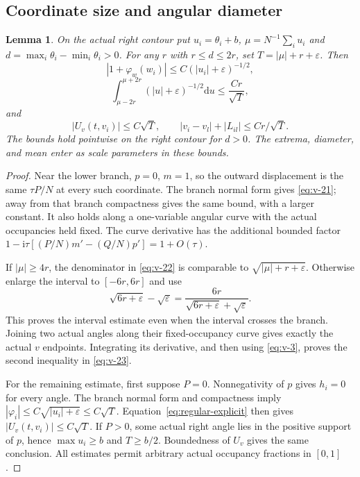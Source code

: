 \documentclass[11pt]{article}
\numberwithin{equation}{section}
\newtheorem{lemma}[theorem]{Lemma}
\theoremstyle{remark}\newtheorem{remark}[theorem]{Remark}
\newcommand{\ii}{\mathrm i}
\newcommand{\dd}{\mathrm d}
\begin{document}
\subsection{Coordinate size and angular diameter}

\begin{lemma}\label{lem:coordinate-scale}
On the actual right contour put
$u_i=\theta_i+b$, $\mu=N^{-1}\sum_i u_i$ and
$d=\max_i\theta_i-\min_i\theta_i>0$.
For any $r$ with $r\le d\le2r$, set $T=|\mu|+r+\varepsilon$.
Then
\begin{equation}\label{eq:v-21}
 |1+\varphi_w(w_i)|\le C(|u_i|+\varepsilon)^{-1/2},
\end{equation}
\begin{equation}\label{eq:v-22}
 \int_{\mu-2r}^{\mu+2r}(|u|+\varepsilon)^{-1/2}\dd u
       \le\frac{Cr}{\sqrt T},
\end{equation}
and
\begin{equation}\label{eq:v-23}
 |U_v(t,v_i)|\le C\sqrt T,\qquad
 |v_i-v_l|+|L_{il}|\le Cr/\sqrt T.
\end{equation}
The bounds hold pointwise on the right contour for $d>0$. The
extrema, diameter, and mean enter as scale parameters in these bounds.
\end{lemma}
\begin{proof}
Near the lower branch, $p=0$, $m=1$, so the outward displacement
is the same $\tau P/N$ at every such coordinate. The branch normal
form gives \eqref{eq:v-21}; away from that branch compactness gives
the same bound, with a larger constant. It also holds along a
one-variable angular curve with the actual occupancies held fixed.
The curve derivative has the additional bounded factor
$1-\ii\tau[(P/N)m'-(Q/N)p']=1+O(\tau)$.

If $|\mu|\ge4r$, the denominator in \eqref{eq:v-22} is comparable
to $\sqrt{|\mu|+r+\varepsilon}$. Otherwise enlarge the interval to
$[-6r,6r]$ and use
\[
 \sqrt{6r+\varepsilon}-\sqrt\varepsilon
 =\frac{6r}{\sqrt{6r+\varepsilon}+\sqrt\varepsilon}.
\]
This proves the interval estimate even when the interval crosses
the branch. Joining two actual angles along their fixed-occupancy
curve gives exactly the actual $v$ endpoints. Integrating its
derivative, and then using \eqref{eq:v-3}, proves the second
inequality in \eqref{eq:v-23}.

For the remaining estimate, first suppose $P=0$.
Nonnegativity of $p$ gives $h_i=0$ for every angle.
The branch normal form and compactness imply
$|\varphi_i|\le C\sqrt{|u_i|+\varepsilon}\le C\sqrt T$.
Equation~\eqref{eq:regular-explicit} then gives
$|U_v(t,v_i)|\le C\sqrt T$.
If $P>0$, some actual right angle lies in the positive support of
$p$, hence $\max u_i\ge b$ and $T\ge b/2$.
Boundedness of $U_v$ gives the same conclusion.
All estimates permit arbitrary actual occupancy fractions in $[0,1]$.

\end{proof}
\end{document}

